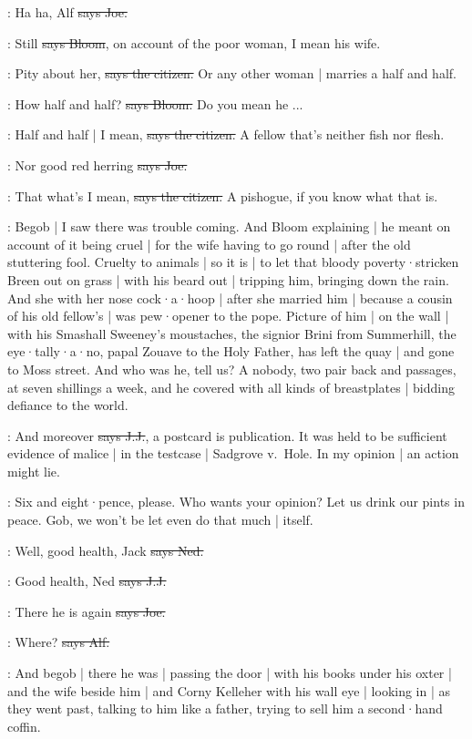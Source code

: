 \joe:
Ha ha,
Alf
\sout{says Joe.}

\Bloom:
Still
\sout{says Bloom},
on account of the poor woman,
I mean his wife.

\citizen:
Pity about her,
\sout{says the citizen.}
Or any other woman |
marries a half and half.

\Bloom:
How half and half?
\sout{says Bloom.}
Do you mean he ...

\citizen:
Half and half |
I mean,
\sout{says the citizen.}
A fellow that's neither fish nor flesh.

\joe:
Nor good red herring
\sout{says Joe.}

\citizen:
That what's I mean,
\sout{says the citizen.}
A pishogue,
if you know what that is.

\Nq:
Begob |
I saw there was trouble coming.
And Bloom explaining |
he meant on account of it being cruel |
for the wife having to go round |
after the old stuttering fool.
Cruelty to animals |
so it is |
to let that bloody poverty·stricken Breen out on grass |
with his beard out |
tripping him,
bringing down the rain.
And she with her nose cock·a·hoop |
after she married him |
because a cousin of his old fellow's |
was pew·opener to the pope.
Picture of him |
on the wall |
with his Smashall Sweeney's moustaches,
the signior Brini from Summerhill,
the eye·tally·a·no,
papal Zouave to the Holy Father,
has left the quay |
and gone to Moss street.
And who was he,
tell us?
A nobody,
two pair back and passages,
at seven shillings a week,
and he covered with all kinds of breastplates
 |
bidding defiance to the world.

\jjom:
And moreover
\sout{says J.J.},
a postcard is publication.
It was held to be sufficient evidence of malice |
in the testcase |
Sadgrove v.~Hole.
In my opinion |
an action might lie.

\Nq:
Six and eight·pence,
please.
Who wants your opinion?
Let us drink our pints in peace.
Gob,
we won't be let even do that much |
itself.

\lambert:
Well,
good health,
Jack
\sout{says Ned.}

\jjom:
Good health,
Ned
\sout{says J.J.}

\joe:
There he is again
\sout{says Joe.}

\bergan:
Where?
\sout{says Alf.}

\Nq:
And begob |
there he was
 |
passing the door |
with his books under his oxter |
and the wife beside him |
and Corny Kelleher with his wall eye |
looking in |
as they went past,
talking to him like a father,
trying to sell him a second·hand coffin.

